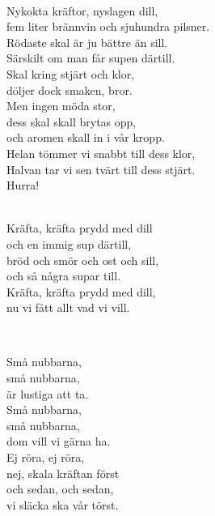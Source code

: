 
 \\       

\songtext{}Nykokta kräftor, nyslagen dill,\\ 
fem liter brännvin och sjuhundra pilsner.\\ 
Rödaste skal är ju bättre än sill.\\ 
Särskilt om man får supen därtill.\\ 
Skal kring stjärt och klor,\\ 
döljer dock smaken, bror.\\ 
Men ingen möda stor,\\ 
dess skal skall brytas opp,\\ 
och aromen skall in i vår kropp.\\ 
Helan tömmer vi snabbt till dess klor,\\ 
Halvan tar vi sen tvärt till dess stjärt.\\ 
Hurra!\\ 


 \\       

\songtext{}
Kräfta, kräfta prydd med dill\\  
och en immig sup därtill,\\  
bröd och smör och ost och sill,\\  
och så några supar till.\\  
Kräfta, kräfta prydd med dill,\\  
nu vi fått allt vad vi vill.\\  

\newpage 


 \\       

\songtext{} 
Små nubbarna,\\ 
små nubbarna,\\ 
är lustiga att ta.\\ 
Små nubbarna,\\ 
små nubbarna,\\ 
dom vill vi gärna ha.\\ 
Ej röra, ej röra,\\ 
nej, skala kräftan först\\ 
och sedan, och sedan,\\ 
vi släcka ska vår törst.\\ 

